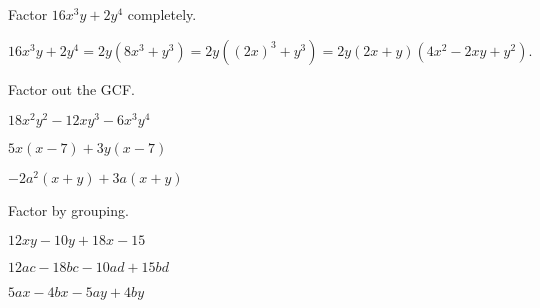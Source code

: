 \begin{example}
	Factor $16x^3y+2y^4$ completely.
\end{example}
\begin{solution}
\[
	16x^3y+2y^4=2y(8x^3+y^3)=2y((2x)^3+y^3)=2y(2x+y)(4x^2-2xy+y^2).
\]
\end{solution}

\newpage


\begin{exercise}
	Factor out the GCF.

	\noindent
	\begin{enumerate*}[label={(\arabic*)~}]
		\item $18x^2y^2-12xy^3-6x^3y^4$
		\item $5x(x-7)+3y(x-7)$
		\item $-2a^2(x+y)+3a(x+y)$  \hfill\null
	\end{enumerate*}
\end{exercise}

\vfill
\begin{center} \hfill
\end{center}

\begin{exercise} Factor by grouping.

	\noindent
	\begin{enumerate*}[label={(\arabic*)~}]
		\item $12xy-10y+18x-15$
		\item $12ac-18bc-10ad+15bd$
		\item $5ax-4bx-5ay+4by$ 
		\hfill\null
	\end{enumerate*}
\end{exercise}



